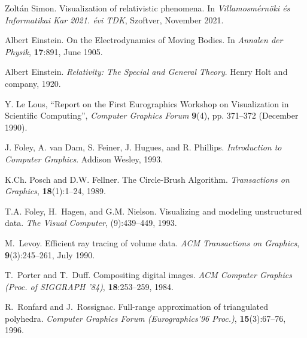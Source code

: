 \documentclass{egpubl}
\begin{document}
\begin{thebibliography}{1}


 Zoltán Simon.
\newblock Visualization of relativistic phenomena.
In \emph{Villamosmérnöki és Informatikai Kar 2021. évi TDK}, Szoftver, November 2021.

 Albert Einstein.
\newblock On the Electrodynamics of Moving Bodies.
In \emph{Annalen der Physik}, \textbf{17}:891, June 1905.

 Albert Einstein.
\newblock \emph{Relativity: The Special and General Theory}.
Henry Holt and company, 1920.

 Y. Le Lous,
``Report on the First Eurographics Workshop on Visualization in
Scientific Computing'', \emph{Computer Graphics Forum\/}
\textbf{9}(4), pp. 371--372 (December 1990).

J. Foley, A. van Dam, S. Feiner, J. Hugues, and R. Phillips.
\newblock \emph{Introduction to Computer Graphics}.
\newblock Addison Wesley, 1993.

K.Ch. Posch and D.W. Fellner.
\newblock The Circle-Brush Algorithm.
\newblock \emph{Transactions on Graphics}, \textbf{18}(1):1--24, 1989.

T.A. Foley, H.~Hagen, and G.M. Nielson.
\newblock Visualizing and modeling unstructured data.
\newblock \emph{The Visual Computer}, (9):439--449, 1993.

M.~Levoy.
\newblock Efficient ray tracing of volume data.
\newblock \emph{ACM Transactions on Graphics},
          \textbf{9}(3):245--261, July 1990.

T.~Porter and T.~Duff.
\newblock Compositing digital images.
\newblock \emph{ACM Computer Graphics (Proc. of SIGGRAPH '84)},
          \textbf{18}:253--259, 1984.

R.~Ronfard and J.~Rossignac.
\newblock Full-range approximation of triangulated polyhedra.
\newblock \emph{Computer Graphics Forum (Eurographics'96 Proc.)},
          \textbf{15}(3):67--76, 1996.

\end{thebibliography}
\end{document}

